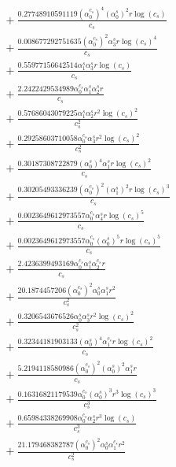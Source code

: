 \documentclass[10pt]{article}
\begin{document}
\begin{align*}
&{}  + \frac{0.27748910591119 \left(\alpha_{0}^{c_s}\right)^{4} \left(\alpha_{0}^s\right)^{2} r \log{\left(c_{s} \right)}}{c_{s}} \\
&{}  + \frac{0.008677292751635 \left(\alpha_{0}^{c_s}\right)^{2} \alpha_{3}^s r \log{\left(c_{s} \right)}^{4}}{c_{s}} \\
&{}  + \frac{0.55977156642514 \alpha_{1}^s \alpha_{3}^s r \log{\left(c_{s} \right)}}{c_{s}} \\
&{}  + \frac{2.2422429534989 \alpha_{0}^{c_s} \alpha_{1}^s \alpha_{2}^s r}{c_{s}} \\
&{}  + \frac{0.57686043079225 \alpha_{1}^s \alpha_{2}^s r^{2} \log{\left(c_{s} \right)}^{2}}{c_{s}^{2}} \\
&{}  + \frac{0.29258603710058 \alpha_{0}^{c_s} \alpha_{3}^s r^{2} \log{\left(c_{s} \right)}^{2}}{c_{s}^{2}} \\
&{}  + \frac{0.30187308722879 \left(\alpha_{0}^s\right)^{4} \alpha_{1}^s r \log{\left(c_{s} \right)}^{2}}{c_{s}} \\
&{}  + \frac{0.30205493336239 \left(\alpha_{0}^{c_s}\right)^{2} \left(\alpha_{1}^s\right)^{2} r \log{\left(c_{s} \right)}^{3}}{c_{s}} \\
&{}  + \frac{0.0023649612973557 \alpha_{0}^{c_s} \alpha_{4}^s r \log{\left(c_{s} \right)}^{5}}{c_{s}} \\
&{}  + \frac{0.0023649612973557 \alpha_{0}^{c_s} \left(\alpha_{0}^s\right)^{5} r \log{\left(c_{s} \right)}^{5}}{c_{s}} \\
&{}  + \frac{2.4236399493169 \alpha_{0}^{c_s} \alpha_{1}^s \alpha_{2}^{c_s} r}{c_{s}} \\
&{}  + \frac{20.1874457206 \left(\alpha_{0}^{c_s}\right)^{2} \alpha_{0}^s \alpha_{1}^s r^{2}}{c_{s}^{2}} \\
&{}  + \frac{0.3206543676526 \alpha_{0}^s \alpha_{3}^s r^{2} \log{\left(c_{s} \right)}^{2}}{c_{s}^{2}} \\
&{}  + \frac{0.32344181903133 \left(\alpha_{0}^s\right)^{4} \alpha_{1}^{c_s} r \log{\left(c_{s} \right)}^{2}}{c_{s}} \\
&{}  + \frac{5.2194118580986 \left(\alpha_{0}^{c_s}\right)^{2} \left(\alpha_{0}^s\right)^{2} \alpha_{1}^s r}{c_{s}} \\
&{}  + \frac{0.16316821179539 \alpha_{0}^{c_s} \left(\alpha_{0}^s\right)^{3} r^{3} \log{\left(c_{s} \right)}^{3}}{c_{s}^{3}} \\
&{}  + \frac{0.65984338269908 \alpha_{0}^{c_s} \alpha_{2}^s r^{3} \log{\left(c_{s} \right)}}{c_{s}^{3}} \\
&{}  + \frac{21.179468382787 \left(\alpha_{0}^{c_s}\right)^{2} \alpha_{0}^s \alpha_{1}^{c_s} r^{2}}{c_{s}^{2}} \\

\end{align*}
\end{document}
